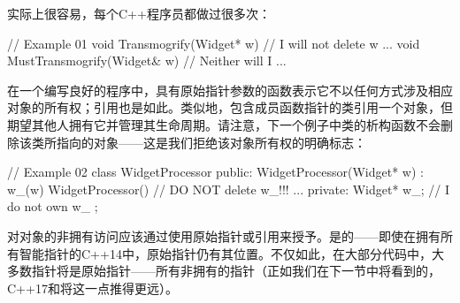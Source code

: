 实际上很容易，每个C++程序员都做过很多次：

\begin{code}
// Example 01
void Transmogrify(Widget* w) {        // I will not delete w
  ...
}
void MustTransmogrify(Widget& w) {   // Neither will I
  ...
}
\end{code}

在一个编写良好的程序中，具有原始指针参数的函数表示它不以任何方式涉及相应对象的所有权；引用也是如此。类似地，包含成员函数指针的类引用一个对象，但期望其他人拥有它并管理其生命周期。请注意，下一个例子中类的析构函数不会删除该类所指向的对象——这是我们拒绝该对象所有权的明确标志：

\begin{code}
// Example 02
class WidgetProcessor {
  public:
  WidgetProcessor(Widget* w) : w_(w) {}
  WidgetProcessor() {} // DO NOT delete w_!!!
    ...
  private:
  Widget* w_;    // I do not own w_
};
\end{code}

对对象的非拥有访问应该通过使用原始指针或引用来授予。是的——即使在拥有所有智能指针的C++14中，原始指针仍有其位置。不仅如此，在大部分代码中，大多数指针将是原始指针——所有非拥有的指针（正如我们在下一节中将看到的，C++17和\cpp[20] 将这一点推得更远）。

